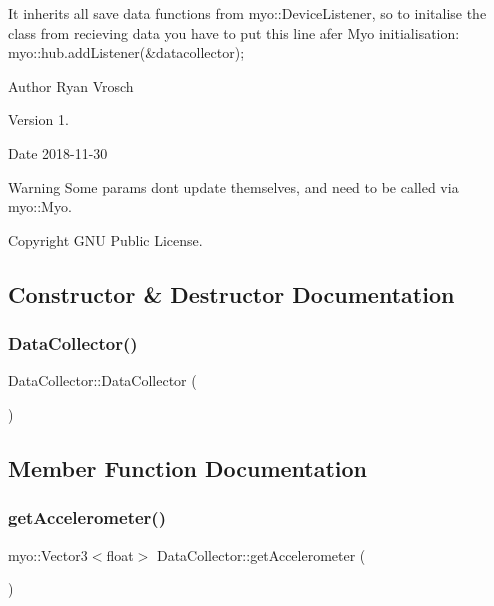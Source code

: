 It inherits all save data functions from myo\+::\+Device\+Listener, so to initalise the class from recieving data you have to put this line afer Myo initialisation\+: myo\+::hub.\+add\+Listener(\&datacollector); \begin{DoxyAuthor}{Author}
Ryan Vrosch 
\end{DoxyAuthor}
\begin{DoxyVersion}{Version}
1. 
\end{DoxyVersion}
\begin{DoxyDate}{Date}
2018-\/11-\/30 
\end{DoxyDate}
\begin{DoxyWarning}{Warning}
Some params dont update themselves, and need to be called via myo\+::\+Myo. 
\end{DoxyWarning}
\begin{DoxyCopyright}{Copyright}
G\+NU Public License. 
\end{DoxyCopyright}


\subsection{Constructor \& Destructor Documentation}
\mbox{\label{class_data_collector_a6f7eccfdf026a83317c386a18d16397d}} 
\subsubsection{Data\+Collector()}
{\footnotesize\ttfamily Data\+Collector\+::\+Data\+Collector (\begin{DoxyParamCaption}{ }\end{DoxyParamCaption})}



\subsection{Member Function Documentation}
\mbox{\label{class_data_collector_a1ef7a2beb37a42d4ac887fef90ac8947}} 
\subsubsection{get\+Accelerometer()}
{\footnotesize\ttfamily myo\+::\+Vector3$<$float$>$ Data\+Collector\+::get\+Accelerometer (\begin{DoxyParamCaption}{ }\end{DoxyParamCaption})\hspace{0.3cm}{\ttfamily [inline]}}



